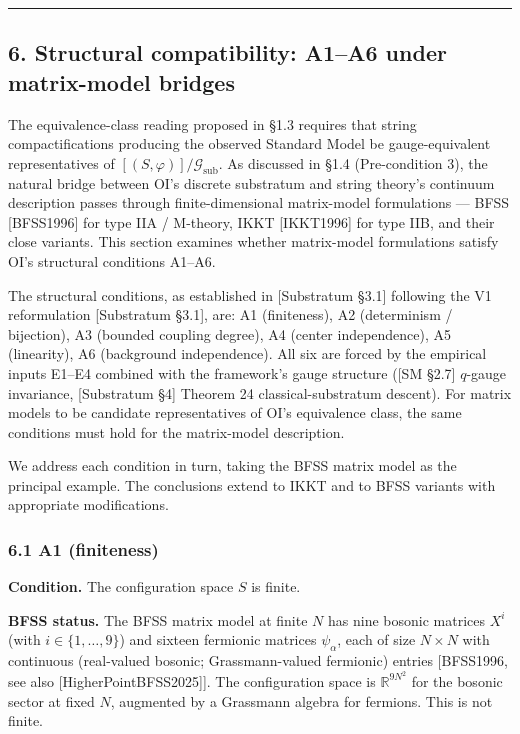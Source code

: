 \documentclass[
]{article}
\begin{document}
\begin{center}\rule{0.5\linewidth}{0.5pt}\end{center}

\hypertarget{structural-compatibility-a1a6-under-matrix-model-bridges}{%
\subsection{6. Structural compatibility: A1--A6 under matrix-model
bridges}\label{structural-compatibility-a1a6-under-matrix-model-bridges}}

The equivalence-class reading proposed in §1.3 requires that string
compactifications producing the observed Standard Model be
gauge-equivalent representatives of
\([(S, \varphi)]/\mathcal{G}_{\text{sub}}\). As discussed in §1.4
(Pre-condition 3), the natural bridge between OI's discrete substratum
and string theory's continuum description passes through
finite-dimensional matrix-model formulations --- BFSS {[}BFSS1996{]} for
type IIA / M-theory, IKKT {[}IKKT1996{]} for type IIB, and their close
variants. This section examines whether matrix-model formulations
satisfy OI's structural conditions A1--A6.

The structural conditions, as established in {[}Substratum §3.1{]}
following the V1 reformulation {[}Substratum §3.1{]}, are: A1
(finiteness), A2 (determinism / bijection), A3 (bounded coupling
degree), A4 (center independence), A5 (linearity), A6 (background
independence). All six are forced by the empirical inputs E1--E4
combined with the framework's gauge structure ({[}SM §2.7{]} \(q\)-gauge
invariance, {[}Substratum §4{]} Theorem 24 classical-substratum
descent). For matrix models to be candidate representatives of OI's
equivalence class, the same conditions must hold for the matrix-model
description.

We address each condition in turn, taking the BFSS matrix model as the
principal example. The conclusions extend to IKKT and to BFSS variants
with appropriate modifications.

\hypertarget{a1-finiteness}{%
\subsubsection{6.1 A1 (finiteness)}\label{a1-finiteness}}

\textbf{Condition.} The configuration space \(S\) is finite.

\textbf{BFSS status.} The BFSS matrix model at finite \(N\) has nine
bosonic matrices \(X^i\) (with \(i \in \{1, \ldots, 9\}\)) and sixteen
fermionic matrices \(\psi_\alpha\), each of size \(N \times N\) with
continuous (real-valued bosonic; Grassmann-valued fermionic) entries
{[}BFSS1996, see also {[}HigherPointBFSS2025{]}{]}. The configuration
space is \(\mathbb{R}^{9N^2}\) for the bosonic sector at fixed \(N\),
augmented by a Grassmann algebra for fermions. This is not finite.
\end{document}
